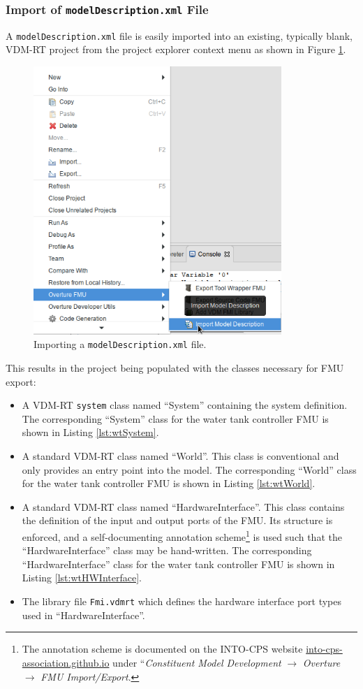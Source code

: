 \subsubsection{Import of \texttt{model\-Description.\allowbreak{}xml} File}
A \texttt{model\-Description.\allowbreak{}xml} file is easily imported into an existing, typically blank, VDM-RT project from the project explorer context menu as shown in Figure \ref{fig:moddescimportoverture}.
%
%
%
\begin{figure}[ht]
\centering
\includegraphics[width=3.7in]{figures/modelDescImportOverture.png}
\caption{Importing a \texttt{model\-Description.\allowbreak{}xml} file.}
\label{fig:moddescimportoverture}
\end{figure}
%
%
%
This results in the project being populated with the classes necessary for FMU export:
%
%
%
\begin{itemize}
\item  A VDM-RT \texttt{system} class named ``System'' containing the system definition.  The corresponding ``System'' class for the water tank controller FMU is shown in Listing \ref{lst:wtSystem}.
%
\item  A standard VDM-RT class named ``World''.  This class is conventional and only provides an entry point into the model.  The corresponding ``World'' class for the water tank controller FMU is shown in Listing \ref{lst:wtWorld}.
%
\item  A standard VDM-RT class named ``HardwareInterface''.  This class contains the definition of the input and output ports of the FMU.  Its structure is enforced, and a self-documenting annotation scheme\footnote{The annotation scheme is documented on the INTO-CPS website \url{into-cps-association.github.io} under ``\textit{Constituent Model Development} $\rightarrow$ \textit{Overture} $\rightarrow$ \textit{FMU Import/Export}.} is used such that the ``HardwareInterface'' class may be hand-written.  The corresponding ``HardwareInterface'' class for the water tank controller FMU is shown in Listing \ref{lst:wtHWInterface}.
%
\item  The library file \texttt{Fmi.vdmrt} which defines the hardware interface port types used in ``HardwareInterface''.
\end{itemize}
